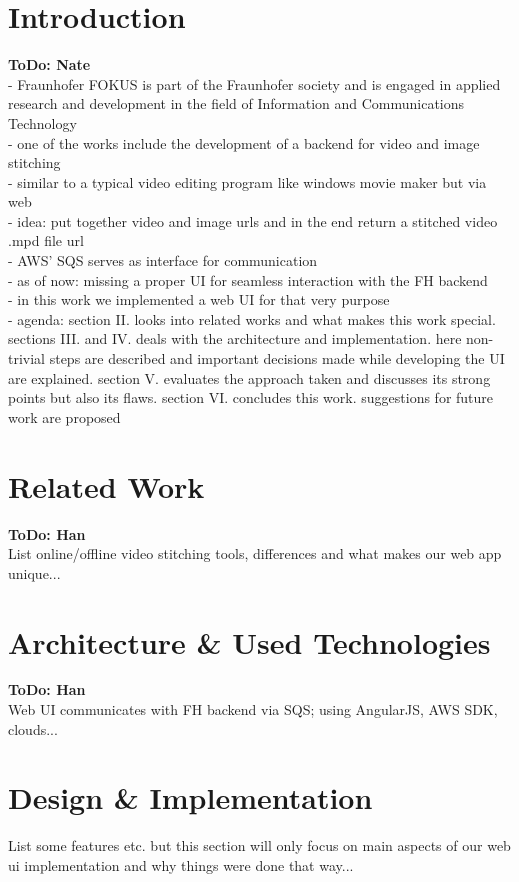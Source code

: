 \documentclass[conference]{IEEEtran}
\begin{document}
\section{Introduction}
\textbf{ToDo: Nate} \\
- Fraunhofer FOKUS is part of the Fraunhofer society and is engaged in applied research and development in the field of Information and Communications Technology \\
- one of the works include the development of a backend for video and image stitching \\
- similar to a typical video editing program like windows movie maker but via web \\
- idea: put together video and image urls and in the end return a stitched video .mpd file url \\
- AWS' SQS serves as interface for communication \\
- as of now: missing a proper UI for seamless interaction with the FH backend \\
- in this work we implemented a web UI for that very purpose \\
- agenda: section II. looks into related works and what makes this work special.
sections III. and IV. deals with the architecture and implementation. here non-trivial steps are described and important decisions made while developing the UI are explained.
section V. evaluates the approach taken and discusses its strong points but also its flaws.
section VI. concludes this work. suggestions for future work are proposed

\section{Related Work}
\textbf{ToDo: Han} \\
List online/offline video stitching tools, differences and what makes our web app unique...

\section{Architecture \& Used Technologies}
\textbf{ToDo: Han} \\
Web UI communicates with FH backend via SQS; using AngularJS, AWS SDK, clouds...

\section{Design \& Implementation}
List some features etc. but this section will only focus on main aspects of our web ui implementation and why things were done that way...
\end{document}
